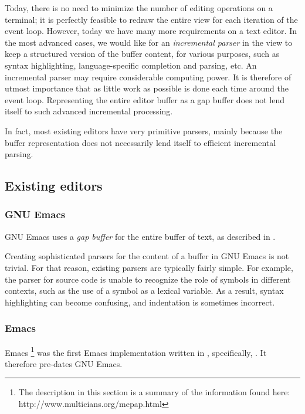 Today, there is no need to minimize the number of editing operations
on a terminal; it is perfectly feasible to redraw the entire view for
each iteration of the event loop.  However, today we have many more
requirements on a text editor.  In the most advanced cases, we would
like for an \emph{incremental parser} in the view to keep a structured
version of the buffer content, for various purposes, such as syntax
highlighting, language-specific completion and parsing, etc.  An
incremental parser may require considerable computing power.  It is
therefore of utmost importance that as little work as possible is done
each time around the event loop.  Representing the entire editor
buffer as a gap buffer does not lend itself to such advanced
incremental processing.

In fact, most existing editors have very primitive parsers, mainly
because the buffer representation does not necessarily lend itself to
efficient incremental parsing.

\subsection{Existing editors}

\subsubsection{GNU Emacs}

GNU Emacs \cite{GNUEmacsLispReferenceManual}
\cite{CraftOfTextEditiing} uses a \emph{gap buffer} for the entire
buffer of text, as described in .

Creating sophisticated parsers for the content of a buffer in GNU
Emacs is not trivial.  For that reason, existing parsers are typically
fairly simple.  For example, the parser for \commonlisp{} source code
is unable to recognize the role of symbols in different contexts, such
as the use of a \commonlisp{} symbol as a lexical variable.  As a
result, syntax highlighting can become confusing, and indentation is
sometimes incorrect.

\subsubsection{\multics{} Emacs}

\multics{} Emacs%
\footnote{The description in this section is a summary of the
  information found here: http://www.multicians.org/mepap.html}
\cite{Greenberg:1980:MEC:800087.802784}
was the first Emacs implementation written in \lisp{}, specifically,
\multics{} \maclisp{}.  It therefore pre-dates GNU Emacs.

